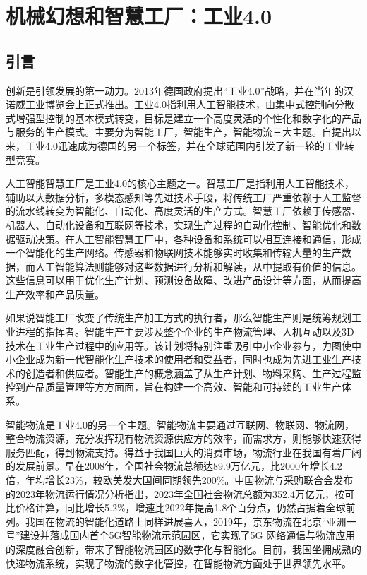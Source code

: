 \setchapterpreamble[u]{\margintoc}
\chapter[机械幻想和智慧工厂：工业4.0]{机械幻想和智慧工厂：工业4.0\footnotemark[0]}



\section{引言}

创新是引领发展的第一动力。2013年德国政府提出“工业4.0”战略，并在当年的汉诺威工业博览会上正式推出。工业4.0指利用人工智能技术，由集中式控制向分散式增强型控制的基本模式转变，目标是建立一个高度灵活的个性化和数字化的产品与服务的生产模式。主要分为智能工厂，智能生产，智能物流三大主题。自提出以来，工业4.0迅速成为德国的另一个标签，并在全球范围内引发了新一轮的工业转型竞赛。

人工智能智慧工厂是工业4.0的核心主题之一。智慧工厂是指利用人工智能技术，辅助以大数据分析，多模态感知等先进技术手段，将传统工厂严重依赖于人工监督的流水线转变为智能化、自动化、高度灵活的生产方式。智慧工厂依赖于传感器、机器人、自动化设备和互联网等技术，实现生产过程的自动化控制、智能优化和数据驱动决策。在人工智能智慧工厂中，各种设备和系统可以相互连接和通信，形成一个智能化的生产网络。传感器和物联网技术能够实时收集和传输大量的生产数据，而人工智能算法则能够对这些数据进行分析和解读，从中提取有价值的信息。这些信息可以用于优化生产计划、预测设备故障、改进产品设计等方面，从而提高生产效率和产品质量。

如果说智能工厂改变了传统生产加工方式的执行者，那么智能生产则是统筹规划工业进程的指挥者。智能生产主要涉及整个企业的生产物流管理、人机互动以及3D技术在工业生产过程中的应用等。该计划将特别注重吸引中小企业参与，力图使中小企业成为新一代智能化生产技术的使用者和受益者，同时也成为先进工业生产技术的创造者和供应者。智能生产的概念涵盖了从生产计划、物料采购、生产过程监控到产品质量管理等方方面面，旨在构建一个高效、智能和可持续的工业生产体系。

智能物流是工业4.0的另一个主题。智能物流主要通过互联网、物联网、物流网，整合物流资源，充分发挥现有物流资源供应方的效率，而需求方，则能够快速获得服务匹配，得到物流支持。得益于我国巨大的消费市场，物流行业在我国有着广阔的发展前景。早在2008年，全国社会物流总额达89.9万亿元，比2000年增长4.2倍，年均增长23\%，较欧美发大国间同期领先200\%。中国物流与采购联合会发布的2023年物流运行情况分析指出，2023年全国社会物流总额为352.4万亿元，按可比价格计算，同比增长5.2\%，增速比2022年提高1.8个百分点，仍然占据着全球前列。我国在物流的智能化道路上同样进展喜人，2019年，京东物流在北京“亚洲一号”建设并落成国内首个5G智能物流示范园区，它实现了5G 网络通信与物流应用的深度融合创新，带来了智能物流园区的数字化与智能化。目前，我国坐拥成熟的快递物流系统，实现了物流的数字化管控，在智能物流方面处于世界领先水平。

